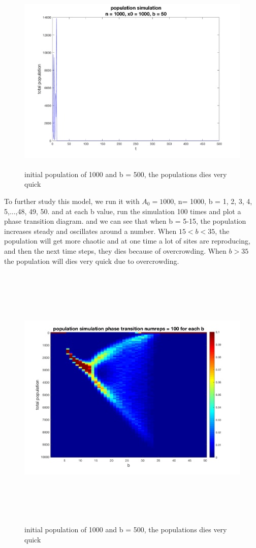 \documentclass[12pt]{article}
\begin{document}
\begin{figure}[H] %
\centering
\includegraphics[width = 12 cm, height = 9cm]{single_run n1000 x01000 b50.png}
\caption{initial population of 1000 and b = 500, the populations dies very quick}
\label{fig:p1s8}
\end{figure}


To further study this model, we run it with $A_{0} = 1000$, n= 1000, b = 1, 2, 3, 4, 5,...,48, 49, 50. and at each b value, run the simulation 100 times and plot a phase transition diagram. and we can see that when b = 5-15, the population increases steady and oscillates around a number. When $15<b<35$, the population will get more chaotic and at one time a lot of sites are reproducing, and then the next time steps, they dies because of overcrowding. When $b>35$ the population will dies very quick due to overcrowding. 


\begin{figure}[H] %
\centering
\includegraphics[width = 16 cm, height = 13cm]{q1_phase_r100.png}
\caption{initial population of 1000 and b = 500, the populations dies very quick}
\label{fig:p1q1pd}
\end{figure}
\end{document}
